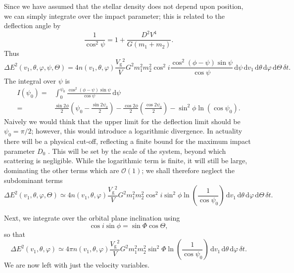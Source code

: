\documentclass[useAMS,usedcolumn,usegraphicx,usenatbib]{mn2e}
\newcommand{\sub}[1]{\ensuremath{_\mathrm{#1}}}
\newcommand{\dd}{\ensuremath{\mathrm{d}}}
\newcommand{\intd}[4]{\ensuremath{\displaystyle \int_{#1}^{#2}{#3}\,\dd{#4}}}
\newcommand{\recip}[1]{\ensuremath{\dfrac{1}{#1}}}
\newcommand{\order}[1]{\ensuremath{\mathcal{O}({#1})}}
\begin{document}
\begin{onecolumn}
Since we have assumed that the stellar density does not depend upon position, we can simply integrate over the impact parameter; this is related to the deflection angle by
\begin{equation}
\recip{\cos^2\psi} = 1 + \frac{D^2V^4}{G(m_1 + m_2)}.
\end{equation}
Thus
\begin{equation}
\Delta E^2(v_1,\theta,\varphi,\psi,\Theta) =  4 n(v_1,\theta,\varphi)\frac{V\sub{g}^2}{V}G^2m_1^2 m_2^2\cos^2i\frac{\cos^2(\phi-\psi)\sin\psi}{\cos\psi} \,\dd \psi\,\dd v_1\,\dd\theta\,\dd\varphi\,\dd\Theta\,\delta t.
\end{equation}
The integral over $\psi$ is
\begin{align}
I(\psi_0) = {} & \intd{0}{\psi_0}{\frac{\cos^2(\phi-\psi)\sin\psi}{\cos\psi}}{\psi}\\
 = {} & \frac{\sin 2\phi}{2}\left(\psi_0 - \frac{\sin 2\psi_0}{2}\right) - \frac{\cos 2\phi}{2}\left(\frac{\cos 2\psi_0}{2}\right) - \sin^2\phi\ln(\cos\psi_0).
\end{align}
Naively we would think that the upper limit for the deflection limit should be $\psi_0 = \pi/2$; however, this would introduce a logarithmic divergence. In actuality there will be a physical cut-off, reflecting a finite bound for the maximum impact parameter $D_0$ \citep{Weinberg1986}. This will be set by the scale of the system, beyond which scattering is negligible. While the logarithmic term is finite, it will still be large, dominating the other terms which are $\order{1}$; we shall therefore neglect the subdominant terms
\begin{equation}
\Delta E^2(v_1,\theta,\varphi,\Theta) \simeq  4 n(v_1,\theta,\varphi)\frac{V\sub{g}^2}{V}G^2m_1^2 m_2^2\cos^2i\sin^2\phi\ln\left(\recip{\cos\psi_0}\right)\,\dd v_1\,\dd\theta\,\dd\varphi\,\dd\Theta\,\delta t.
\end{equation}

Next, we integrate over the orbital plane inclination using
\begin{equation}
\cos i\sin\phi = \sin\Phi\cos\Theta,
\end{equation}
so that
\begin{equation}
\Delta E^2(v_1,\theta,\varphi) \simeq  4\pi n(v_1,\theta,\varphi)\frac{V\sub{g}^2}{V}G^2m_1^2 m_2^2\sin^2\Phi\ln\left(\recip{\cos\psi_0}\right)\,\dd v_1\,\dd\theta\,\dd\varphi\,\delta t.
\end{equation}
We are now left with just the velocity variables.


\end{onecolumn}
\end{document}
